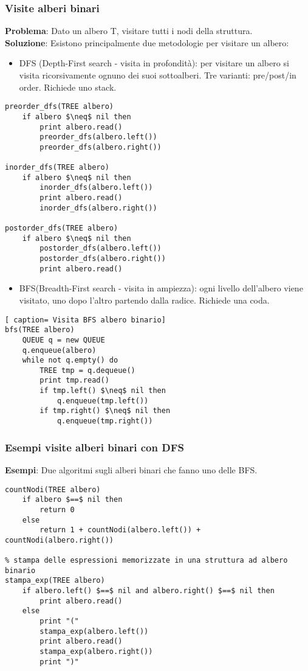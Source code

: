\documentclass[../cheatSheetAlgoritmi.tex]{subfiles}
\begin{document}
\subsubsection{Visite alberi binari}
\textbf{Problema}: Dato un albero T, visitare tutti i nodi della struttura.\\
\textbf{Soluzione}: Esistono principalmente due metodologie per visitare un albero:
\begin{itemize}
	\item DFS (Depth-First search - visita in profondità): per visitare un albero si visita ricorsivamente ognuno dei suoi sottoalberi. Tre varianti: pre/post/in order. Richiede uno stack.
\end{itemize}
\begin{lstlisting}[caption= Visita DFS albero bin]
preorder_dfs(TREE albero)
	if albero $\neq$ nil then
		print albero.read()
		preorder_dfs(albero.left())
		preorder_dfs(albero.right())

inorder_dfs(TREE albero)
	if albero $\neq$ nil then
		inorder_dfs(albero.left())
		print albero.read()
		inorder_dfs(albero.right())

postorder_dfs(TREE albero)
	if albero $\neq$ nil then
		postorder_dfs(albero.left())
		postorder_dfs(albero.right())
		print albero.read()
\end{lstlisting}
\begin{itemize}
 	\item BFS(Breadth-First search - visita in ampiezza): ogni livello dell'albero viene visitato, uno dopo l'altro partendo dalla radice. Richiede una coda. 
\end{itemize}
\begin{lstlisting}[ caption= Visita BFS albero binario]
bfs(TREE albero)
	QUEUE q = new QUEUE
	q.enqueue(albero)
	while not q.empty() do
		TREE tmp = q.dequeue()
		print tmp.read()
		if tmp.left() $\neq$ nil then
			q.enqueue(tmp.left())
		if tmp.right() $\neq$ nil then
			q.enqueue(tmp.right())
\end{lstlisting}
\newpage

\subsubsection{Esempi visite alberi binari con DFS}
\textbf{Esempi}: Due algoritmi sugli alberi binari che fanno uno delle BFS.
\begin{lstlisting}[caption= Esempi DFS alberi binari]
% conta i nodi di un albero binario
countNodi(TREE albero)
	if albero $==$ nil then
		return 0
	else 
		return 1 + countNodi(albero.left()) + countNodi(albero.right())

% stampa delle espressioni memorizzate in una struttura ad albero binario
stampa_exp(TREE albero)
	if albero.left() $==$ nil and albero.right() $==$ nil then
		print albero.read()
	else 
		print "("
		stampa_exp(albero.left())
		print albero.read()
		stampa_exp(albero.right())
		print ")"
\end{lstlisting}
\end{document}
